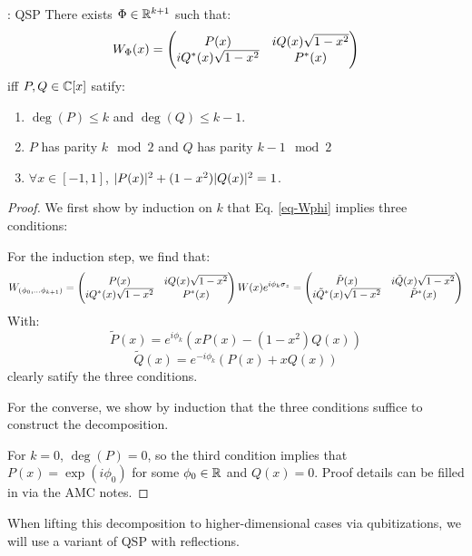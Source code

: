 \begin{lembox}{: QSP}
    There exists $\Phi \in \mathbb{R}^{k+1}$ such that:
    \begin{equation}\label{eq-Wphi}
        W_{\Phi}(x) = \begin{pmatrix}P(x) & iQ(x)\sqrt{1-x^2} \\ iQ^*(x)\sqrt{1-x^2} & P^*(x)\end{pmatrix}
    \end{equation}
    iff $P, Q \in \mathbb{C}[x]$ satify:
    \begin{enumerate}
        \item $\deg(P) \leq k$ and $\deg(Q) \leq k-1$.
        \item $P$ has parity $k \mod 2$ and $Q$ has parity $k - 1 \mod 2$
        \item $\forall x \in [-1, 1]$, $\lvert P(x) \rvert^2 + (1-x^2)\lvert Q(x) \rvert^2 = 1$. 
    \end{enumerate}
\end{lembox}
\begin{proof}
    We first show by induction on $k$ that Eq. \eqref{eq-Wphi} implies three conditions:

    For the induction step, we find that:
    \begin{equation}
        W_{(\phi_0, \ldots \phi_{k+1})} = \begin{pmatrix}P(x) & iQ(x)\sqrt{1-x^2} \\ iQ^*(x)\sqrt{1-x^2} & P^*(x)\end{pmatrix}W(x)e^{i\phi_k\sigma_z} =  \begin{pmatrix}\tilde{P}(x) & i\tilde{Q}(x)\sqrt{1-x^2} \\ i\tilde{Q}^*(x)\sqrt{1-x^2} & \tilde{P}^*(x)\end{pmatrix}
    \end{equation}
    With:
    \begin{equation}
        \tilde{P}(x) = e^{i\phi_k}\left(xP(x) - (1-x^2)Q(x)\right)
    \end{equation}
    \begin{equation}
        \tilde{Q}(x) = e^{-i\phi_k}\left(P(x) + xQ(x)\right)
    \end{equation}
    clearly satify the three conditions.

    For the converse, we show by induction that the three conditions suffice to construct the decomposition.

    For $k=0$, $\deg(P) = 0$, so the third condition implies that $P(x) = \exp(i\phi_0)$ for some $\phi_0 \in \mathbb{R}$ and $Q(x) = 0$. Proof details can be filled in via the AMC notes.
\end{proof}

When lifting this decomposition to higher-dimensional cases via qubitizations, we will use a variant of QSP with reflections.

